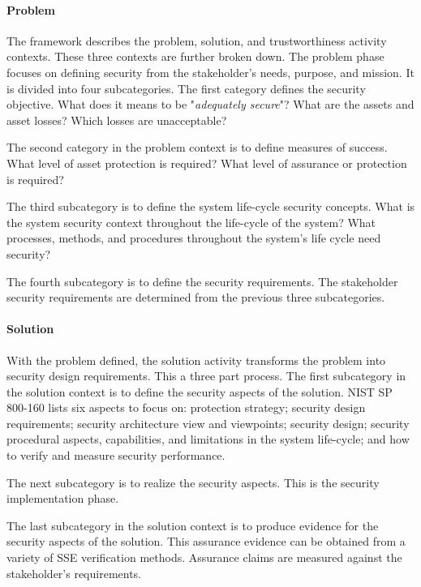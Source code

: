 \documentclass[../../main/main.tex]{subfiles}
\begin{document}
\paragraph*{Problem}
The framework describes the problem, solution, and trustworthiness activity contexts.  These three contexts are further broken down.  The problem phase focuses on defining security from the stakeholder's needs, purpose, and mission.  It is divided into four subcategories.  The first category defines the security objective. What does it means to be "\textit{adequately secure}"?   What are the assets and asset losses?  Which losses are unacceptable?
 
The second category in the problem context is to define measures of success.  What level of asset protection is required?  What level of assurance or protection is required?  

The third subcategory is to define the system life-cycle security concepts.  What is the system security context throughout the life-cycle of the system?  What processes, methods, and procedures throughout the system's life cycle need security?  

The fourth subcategory is to define the security requirements.  The stakeholder security requirements are determined from the previous three subcategories.

\paragraph*{Solution}
With the problem defined, the solution activity transforms the problem into security design requirements.  This a three part process.  The first subcategory in the solution context is to define the security aspects of the solution. NIST SP 800-160 lists six aspects to focus on: protection strategy; security design requirements; security architecture view and viewpoints; security design; security procedural aspects, capabilities, and limitations in the system life-cycle; and how to verify and measure security performance. 

The next subcategory is to realize the security aspects.  This is the security implementation phase.

The last subcategory in the solution context is to produce evidence for the security aspects of the solution. This assurance evidence can be obtained from a variety of SSE verification methods.  Assurance claims are measured against the stakeholder's requirements.
\end{document}
